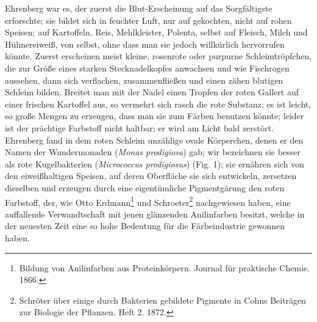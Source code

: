 \documentclass[a4paper, 11pt, oneside, english]{article}
\begin{document}
Ehrenberg war es, der zuerst die Blut-Erscheinung auf das Sorgfältigste erforschte; sie bildet sich in feuchter Luft, nur auf gekochten, nicht auf rohen Speisen; auf Kartoffeln, Reis, Mehlkleister, Polenta, selbst auf Fleisch, Milch und Hühnereiweiß, von selbst, ohne dass man sie jedoch willkürlich hervorrufen könnte. Zuerst erscheinen meist kleine, rosenrote oder purpurne Schleimtröpfchen, die zur Größe eines starken Stecknadelkopfes anwachsen und wie Fischrogen aussehen, dann sich verflachen, zusammenfließen und einen zähen blutigen Schleim bilden. Breitet man mit der Nadel einen Tropfen der roten Gallert auf einer frischen Kartoffel aus, so vermehrt sich rasch die rote Substanz; es ist leicht, so große Mengen zu erzeugen, dass man sie zum Färben benutzen könnte; leider ist der prächtige Farbstoff nicht haltbar; er wird am Licht bald zerstört. Ehrenberg fand in dem roten Schleim unzählige ovale Körperchen, denen er den Namen der Wundermonaden (\emph{Monas prodigiosa}) gab; wir bezeichnen sie besser als rote Kugelbakterien (\emph{Micrococcus prodigiosus}) (Fig. 1); sie ernähren sich von den eiweißhaltigen Speisen, auf deren Oberfläche sie sich entwickeln, zersetzen dieselben und erzeugen durch eine eigentümliche Pigmentgärung den roten Farbstoff, der, wie Otto Erdmann\footnote{Bildung von Anilinfarben aus Proteinkörpern. Journal für praktische Chemie. 1866.} und Schroeter\footnote{Schröter über einige durch Bakterien gebildete Pigmente in Cohns Beiträgen zur Biologie der Pflanzen. Heft 2. 1872.} nachgewiesen haben, eine auffallende Verwandtschaft mit jenen glänzenden Anilinfarben besitzt, welche in der neuesten Zeit eine so hohe Bedeutung für die Färbeindustrie gewonnen haben.
\end{document}
